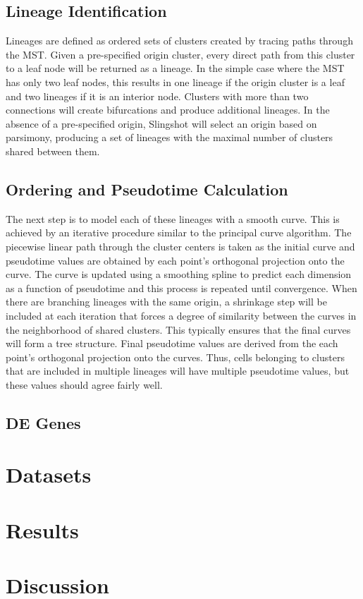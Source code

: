 \documentclass[11pt]{article}\usepackage[]{graphicx}\usepackage[]{color}
\begin{document}
\subsection{Lineage Identification}
Lineages are defined as ordered sets of clusters created by tracing paths through the MST. Given a pre-specified origin cluster, every direct path from this cluster to a leaf node will be returned as a lineage. In the simple case where the MST has only two leaf nodes, this results in one lineage if the origin cluster is a leaf and two lineages if it is an interior node. Clusters with more than two connections will create bifurcations and produce additional lineages. In the absence of a pre-specified origin, Slingshot will select an origin based on parsimony, producing a set of lineages with the maximal number of clusters shared between them.

\subsection{Ordering and Pseudotime Calculation}
The next step is to model each of these lineages with a smooth curve. This is achieved by an iterative procedure similar to the principal curve algorithm. The piecewise linear path through the cluster centers is taken as the initial curve and pseudotime values are obtained by each point’s orthogonal projection onto the curve. The curve is updated using a smoothing spline to predict each dimension as a function of pseudotime and this process is repeated until convergence. When there are branching lineages with the same origin, a shrinkage step will be included at each iteration that forces a degree of similarity between the curves in the neighborhood of shared clusters. This typically ensures that the final curves will form a tree structure. Final pseudotime values are derived from the each point’s orthogonal projection onto the curves. Thus, cells belonging to clusters that are included in multiple lineages will have multiple pseudotime values, but these values should agree fairly well.

\subsection{DE Genes}

\section{Datasets}



\section{Results}

\section{Discussion}
\end{document}
